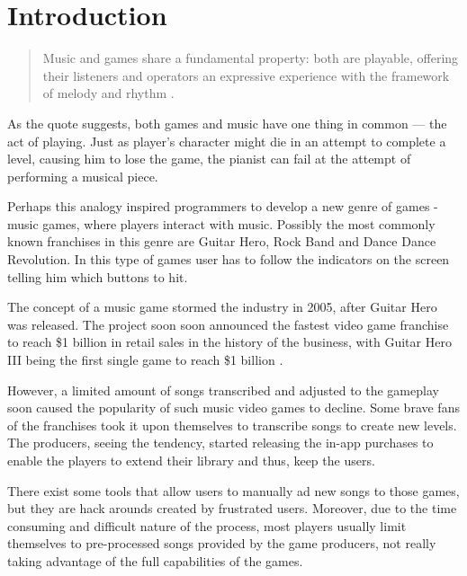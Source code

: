 
\chapter{Introduction} %

\label{Chapter3} %



\begin{quotation}
Music and games share a fundamental property: both are playable, offering their listeners and operators an expressive experience with the framework of melody and rhythm \cite{introquote}.
\end{quotation} 

As the quote suggests, both games and music have one thing in common — the act of playing. Just as player’s character might die in an attempt to complete a level, causing him to lose the game, the pianist can fail at the attempt of performing a musical piece. 

Perhaps this analogy inspired programmers to develop a new genre of games - music games, where players interact with music. Possibly the most commonly known franchises in this genre are Guitar Hero, Rock Band and Dance Dance Revolution. In this type of games user has to follow the indicators on the screen telling him which buttons to hit. 

The concept of a music game stormed the industry in 2005, after Guitar Hero was released. The project soon soon announced the fastest video game franchise to reach \$1 billion in retail sales in the history of the business, with Guitar Hero III being the first single game to reach \$1 billion \cite{GHSales}.

However, a limited amount of songs transcribed and adjusted to the gameplay soon caused the popularity of such music video games to decline. Some brave fans of the franchises took it upon themselves to transcribe songs to create new levels. The producers, seeing the tendency, started releasing the in-app purchases to enable the players to extend their library and thus, keep the users. 

There exist some tools that allow users to manually ad new songs to those games, but they are hack arounds created by frustrated users. Moreover, due to the time consuming and difficult nature of the process, most players usually limit themselves to pre-processed songs provided by the game producers, not really taking advantage of the full capabilities of the games. 

